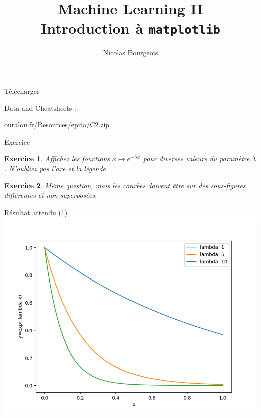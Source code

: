 \documentclass[11pt]{beamer}
\title{Machine Learning II \\ Introduction à \texttt{matplotlib}}
\author{Nicolas Bourgeois}
\date{}
\newtheorem{exercice}{Exercice}
\begin{document}
\begin{frame}
\maketitle
\end{frame}

\begin{frame}{Télécharger}

Data and Cheatsheets :\\
\vspace{0.3cm}

\url{ouralou.fr/Resources/epita/C2.zip}


\end{frame}


\begin{frame}{Exercice}
\begin{exercice}
Affichez les fonctions $x \mapsto e^{-\lambda x}$ pour diverses valeurs du paramètre $\lambda$. N'oubliez pas l'axe et la légende.
\end{exercice}

\begin{exercice}
Même question, mais les courbes doivent être sur des sous-figures différentes et non superposées.
\end{exercice}
\end{frame}

\begin{frame}{Résultat attendu (1)}
\includegraphics[scale=0.45]{ex201}
\end{frame}
\end{document}
